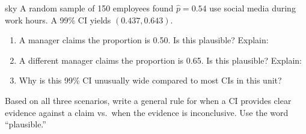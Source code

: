 \documentclass[10pt]{article}
\begin{document}
\begin{scenariobox}{sky}
A random sample of 150 employees found $\hat p = 0.54$ use social media during work hours.
A 99\% CI yields $(0.437, 0.643)$.

\begin{enumerate}[label=\alph*.]
  \item A manager claims the proportion is 0.50. Is this plausible? \blank{2cm} Explain: 

  \item A different manager claims the proportion is 0.65. Is this plausible? \blank{2cm} Explain: 

  \item Why is this 99\% CI unusually wide compared to most CIs in this unit?
\end{enumerate}
\end{scenariobox}

\begin{reflectionbox}
Based on all three scenarios, write a general rule for when a CI provides clear evidence
against a claim vs.\ when the evidence is inconclusive. Use the word ``plausible.''
\end{reflectionbox}
\end{document}
